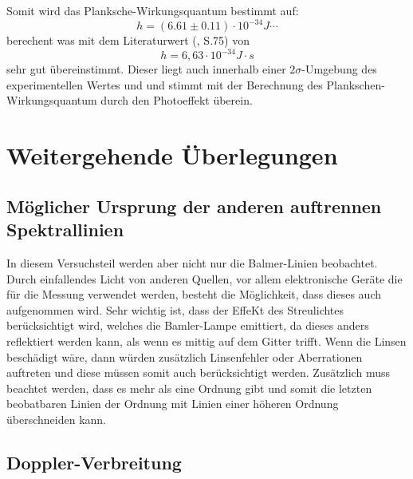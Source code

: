 Somit wird das Planksche-Wirkungsquantum bestimmt auf:
\begin{equation}
    h = (6.61 \pm 0.11)\cdot 10^{-34} J\cdots
\end{equation}
berechent was mit dem Literaturwert (\cite{Demtröder_Ex3}, S.75) von
\begin{equation}
    h = 6,63 \cdot10^{-34} J\cdot s
\end{equation}
sehr gut übereinstimmt.
Dieser liegt auch innerhalb einer $2\sigma$-Umgebung des experimentellen Wertes und und stimmt mit der Berechnung des Plankschen-Wirkungsquantum durch den Photoeffekt überein.


\section{Weitergehende Überlegungen}
\subsection{Möglicher Ursprung der anderen auftrennen Spektrallinien}
In diesem Versuchsteil werden aber nicht nur die Balmer-Linien beobachtet. 
Durch einfallendes Licht von anderen Quellen, vor allem elektronische Geräte die für die Messung verwendet werden, besteht die Möglichkeit, dass dieses auch aufgenommen wird.
Sehr wichtig ist, dass der EffeKt des Streulichtes berücksichtigt wird, welches die Bamler-Lampe emittiert, da dieses anders reflektiert werden kann, als wenn es mittig auf dem Gitter trifft.
Wenn die Linsen beschädigt wäre, dann würden zusätzlich Linsenfehler oder Aberrationen auftreten und diese müssen somit auch berücksichtigt werden. 
Zusätzlich muss beachtet werden, dass es mehr als eine Ordnung gibt und somit die letzten beobatbaren Linien der Ordnung mit Linien einer höheren Ordnung überschneiden kann.

\subsection{Doppler-Verbreitung}

